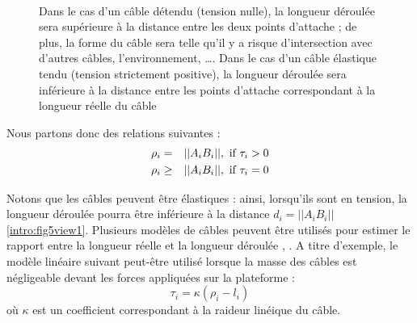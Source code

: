 \begin{figure}[!ht]
  \centering
       \hfill
     \\
    \caption{\footnotesize{Dans le cas d'un câble détendu (tension nulle), la longueur déroulée sera supérieure à la distance entre les deux points d'attache ; de plus, la forme du câble sera telle qu'il y a risque d'intersection avec d'autres câbles, l'environnement, \dots. Dans le cas d'un câble élastique tendu (tension strictement positive), la longueur déroulée sera inférieure à la distance entre les points d'attache correspondant à la longueur réelle du câble}}
\label{intro:fig6}
\end{figure}

Nous partons donc des relations suivantes :
\begin{eqnarray}
\rho_i &=& ||A_i B_i||, \hbox{ if } \tau_i > 0 \\ 
\rho_i &\geq& ||A_i B_i||, \hbox{ if } \tau_i = 0
\label{intro:eq1}
\end{eqnarray}

Notons que les câbles peuvent être élastiques : ainsi, lorsqu'ils sont en tension, la longueur déroulée pourra être inférieure à la distance $d_i = ||A_i B_i||$ \ref{intro:fig5view1}. Plusieurs modèles de câbles peuvent être utilisés pour estimer le rapport entre la longueur réelle et la longueur déroulée \cite{1974IrvineCaughey}, \cite{2006:Kozak.ea}. A titre d'exemple, le modèle linéaire suivant peut-être utilisé lorsque la masse des câbles est négligeable devant les forces appliquées sur la plateforme :
$$\tau_i = \kappa(\rho_i - l_i)$$
où $\kappa$ est un coefficient correspondant à la raideur linéique du câble.

